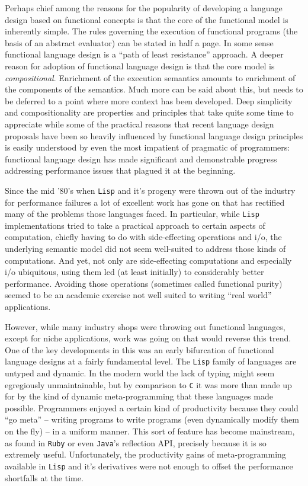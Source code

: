 Perhaps chief among the reasons for the popularity of developing a
language design based on functional concepts is that the core of the
functional model is inherently simple. The rules governing the
execution of functional programs (the basis of an abstract evaluator)
can be stated in half a page. In some sense functional language design
is a ``path of least resistance'' approach. A deeper reason for
adoption of functional language design is that the core model is
\emph{compositional}. Enrichment of the execution semantics amounts to
enrichment of the components of the semantics. Much more can be said
about this, but needs to be deferred to a point where more context has
been developed. Deep simplicity and compositionality are properties
and principles that take quite some time to appreciate while some of
the practical reasons that recent language design proposals have been
so heavily influenced by functional language design principles is
easily understood by even the most impatient of pragmatic of
programmers: functional language design has made significant and
demonstrable progress addressing performance issues that plagued it at
the beginning.

Since the mid '80's when \texttt{Lisp} and it's progeny were thrown
out of the industry for performance failures a lot of excellent work
has gone on that has rectified many of the problems those languages
faced. In particular, while \texttt{Lisp} implementations tried to
take a practical approach to certain aspects of computation, chiefly
having to do with side-effecting operations and i/o, the underlying
semantic model did not seem well-suited to address those kinds of
computations. And yet, not only are side-effecting computations and
especially i/o ubiquitous, using them led (at least initially) to
considerably better performance. Avoiding those operations (sometimes
called functional purity) seemed to be an academic exercise not well
suited to writing ``real world'' applications.

However, while many industry shops were throwing out functional
languages, except for niche applications, work was going on that would
reverse this trend. One of the key developments in this was an early
bifurcation of functional language designs at a fairly fundamental
level. The \texttt{Lisp} family of languages are untyped and
dynamic. In the modern world the lack of typing might seem egregiously
unmaintainable, but by comparison to \texttt{C} it was more than made
up for by the kind of dynamic meta-programming that these languages
made possible. Programmers enjoyed a certain kind of productivity
because they could ``go meta'' -- writing programs to write programs
(even dynamically modify them on the fly) -- in a uniform manner. This
sort of feature has become mainstream, as found in \texttt{Ruby} or
even \texttt{Java}'s reflection API, precisely because it is so
extremely useful. Unfortunately, the productivity gains of
meta-programming available in \texttt{Lisp} and it's derivatives were
not enough to offset the performance shortfalls at the time.

